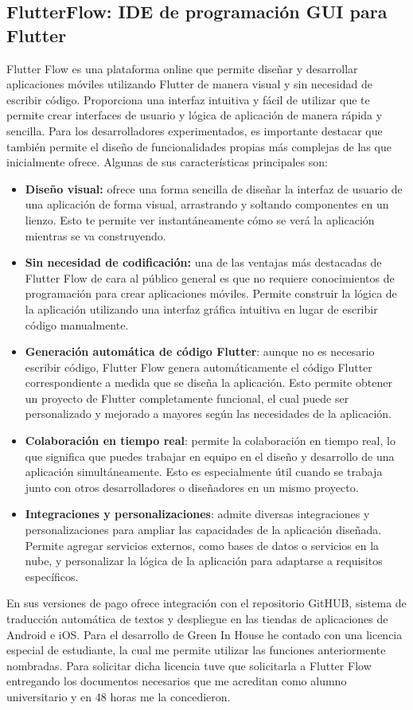     \subsection{FlutterFlow: IDE de programación GUI para Flutter}
    Flutter Flow \cite{wiki:flutter_flow} es una plataforma online que permite diseñar y desarrollar aplicaciones móviles utilizando Flutter de manera visual y sin necesidad de escribir código. Proporciona una interfaz intuitiva y fácil de utilizar que te permite crear interfaces de usuario y lógica de aplicación de manera rápida y sencilla. Para los desarrolladores experimentados, es importante destacar que también permite el diseño de funcionalidades propias más complejas de las que inicialmente ofrece. Algunas de sus características principales son:
    \begin{itemize}
        \item \textbf{Diseño visual:} ofrece una forma sencilla de diseñar la interfaz de usuario de una aplicación de forma visual, arrastrando y soltando componentes en un lienzo. Esto te permite ver instantáneamente cómo se verá la aplicación mientras se va construyendo.
        \item \textbf{Sin necesidad de codificación:} una de las ventajas más destacadas de Flutter Flow de cara al público general es que no requiere conocimientos de programación para crear aplicaciones móviles. Permite construir la lógica de la aplicación utilizando una interfaz gráfica intuitiva en lugar de escribir código manualmente.
        \item \textbf{Generación automática de código Flutter}: aunque no es necesario escribir código, Flutter Flow genera automáticamente el código Flutter correspondiente a medida que se diseña la aplicación. Esto permite obtener un proyecto de Flutter completamente funcional, el cual puede ser personalizado y mejorado a mayores según las necesidades de la aplicación.    
        \item \textbf{Colaboración en tiempo real}: permite la colaboración en tiempo real, lo que significa que puedes trabajar en equipo en el diseño y desarrollo de una aplicación simultáneamente. Esto es especialmente útil cuando se trabaja junto con otros desarrolladores o diseñadores en un mismo proyecto.    
        \item \textbf{Integraciones y personalizaciones}: admite diversas integraciones y personalizaciones para ampliar las capacidades de la aplicación diseñada. Permite agregar servicios externos, como bases de datos o servicios en la nube, y personalizar la lógica de la aplicación para adaptarse a requisitos específicos.
    \end{itemize}
    En sus versiones de pago ofrece integración con el repositorio GitHUB, sistema de traducción automática de textos y despliegue en las tiendas de aplicaciones de Android e iOS. Para el desarrollo de Green In House he contado con una licencia especial de estudiante, la cual me permite utilizar las funciones anteriormente nombradas. Para solicitar dicha licencia tuve que solicitarla a Flutter Flow entregando los documentos necesarios que me acreditan como alumno universitario y en 48 horas me la concedieron.